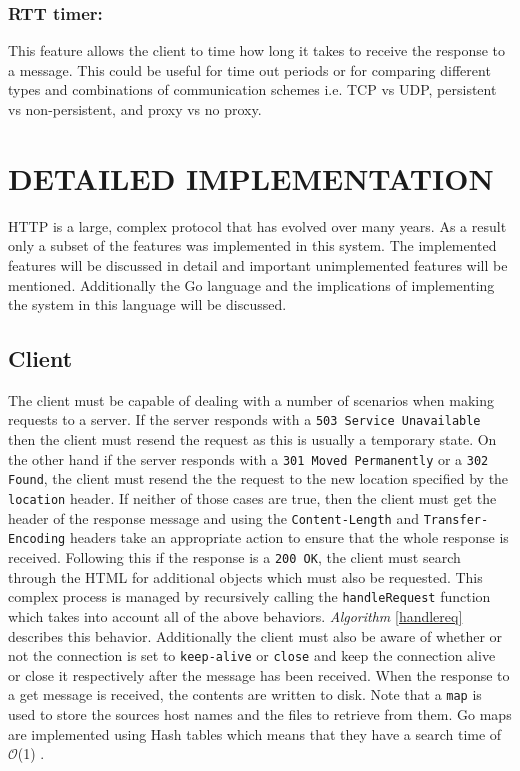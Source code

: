 \documentclass[10pt,twocolumn]{witseiepaper}
\begin{document}
	\subsubsection{RTT timer:}

	This feature allows the client to time how long it takes to receive the response to a message. This could be useful for time out periods or for comparing different types and combinations of communication schemes i.e. TCP vs UDP, persistent vs non-persistent, and proxy vs no proxy.

\section{DETAILED IMPLEMENTATION}

HTTP is a large, complex protocol that has evolved over many years. As a result only a subset of the features was implemented in this system. The implemented features will be discussed in detail and important unimplemented features will be mentioned. Additionally the Go language and the implications of implementing the system in this language will be discussed.

	\subsection{Client}

	The client must be capable of dealing with a number of scenarios when making requests to a server. If the server responds with a \texttt{503 Service Unavailable} then the client must resend the request as this is usually a temporary state. On the other hand if the server responds with a \texttt{301 Moved Permanently} or a \texttt{302 Found}, the client must resend the the request to the new location specified by the \texttt{location} header. If neither of those cases are true, then the client must get the header of the response message and using the \texttt{Content-Length} and \texttt{Transfer-Encoding} headers take an appropriate action to ensure that the whole response is received. Following this if the response is a \texttt{200 OK}, the client must search through the HTML for additional objects which must also be requested. This complex process is managed by recursively calling the \texttt{handleRequest} function which takes into account all of the above behaviors. \emph{Algorithm} \ref{handlereq} describes this behavior. Additionally the client must also be aware of whether or not the connection is set to \texttt{keep-alive} or \texttt{close} and keep the connection alive or close it respectively after the message has been received. When the response to a get message is received, the contents are written to disk. Note that a \texttt{map} is used to store the sources host names and the files to retrieve from them. Go maps are implemented using Hash tables which means that they have a search time of $\mathcal{O}$(1) \cite{map}.
\end{document}
